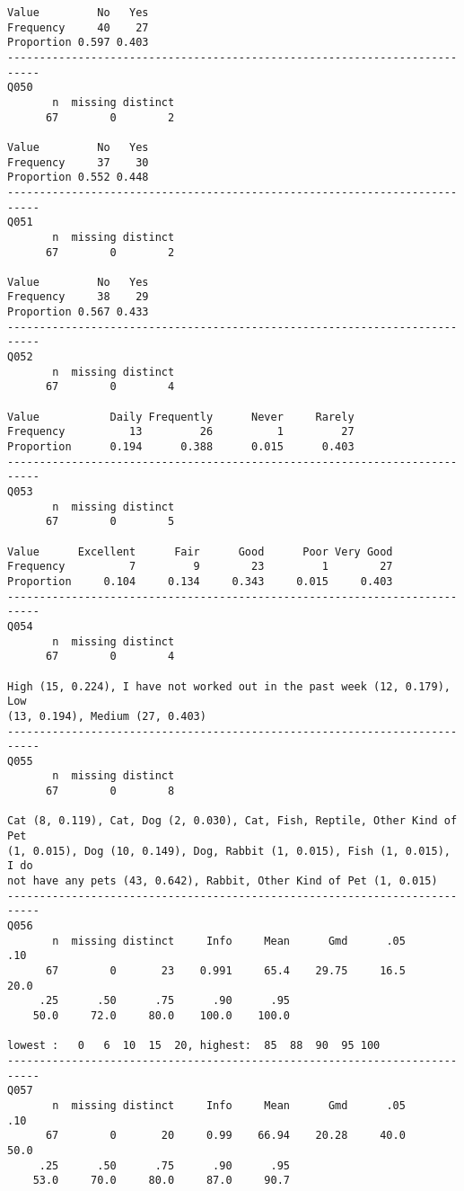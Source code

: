\documentclass[]{article}
\begin{document}
\begin{verbatim}
Value         No   Yes
Frequency     40    27
Proportion 0.597 0.403
---------------------------------------------------------------------------
Q050 
       n  missing distinct 
      67        0        2 
                      
Value         No   Yes
Frequency     37    30
Proportion 0.552 0.448
---------------------------------------------------------------------------
Q051 
       n  missing distinct 
      67        0        2 
                      
Value         No   Yes
Frequency     38    29
Proportion 0.567 0.433
---------------------------------------------------------------------------
Q052 
       n  missing distinct 
      67        0        4 
                                                      
Value           Daily Frequently      Never     Rarely
Frequency          13         26          1         27
Proportion      0.194      0.388      0.015      0.403
---------------------------------------------------------------------------
Q053 
       n  missing distinct 
      67        0        5 
                                                            
Value      Excellent      Fair      Good      Poor Very Good
Frequency          7         9        23         1        27
Proportion     0.104     0.134     0.343     0.015     0.403
---------------------------------------------------------------------------
Q054 
       n  missing distinct 
      67        0        4 

High (15, 0.224), I have not worked out in the past week (12, 0.179), Low
(13, 0.194), Medium (27, 0.403)
---------------------------------------------------------------------------
Q055 
       n  missing distinct 
      67        0        8 

Cat (8, 0.119), Cat, Dog (2, 0.030), Cat, Fish, Reptile, Other Kind of Pet
(1, 0.015), Dog (10, 0.149), Dog, Rabbit (1, 0.015), Fish (1, 0.015), I do
not have any pets (43, 0.642), Rabbit, Other Kind of Pet (1, 0.015)
---------------------------------------------------------------------------
Q056 
       n  missing distinct     Info     Mean      Gmd      .05      .10 
      67        0       23    0.991     65.4    29.75     16.5     20.0 
     .25      .50      .75      .90      .95 
    50.0     72.0     80.0    100.0    100.0 

lowest :   0   6  10  15  20, highest:  85  88  90  95 100
---------------------------------------------------------------------------
Q057 
       n  missing distinct     Info     Mean      Gmd      .05      .10 
      67        0       20     0.99    66.94    20.28     40.0     50.0 
     .25      .50      .75      .90      .95 
    53.0     70.0     80.0     87.0     90.7 
                                                                      

\end{verbatim}
\end{document}
